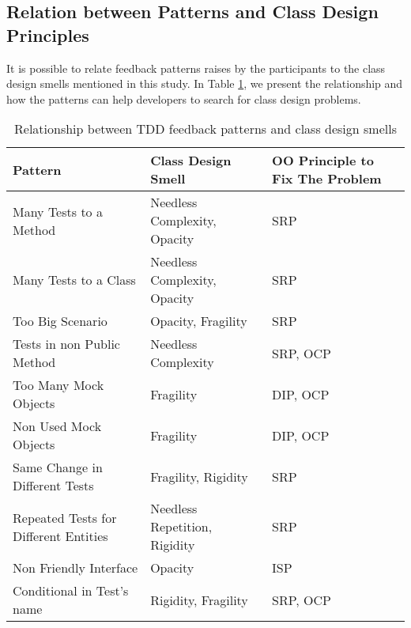 \documentclass[times]{elsarticle}
\begin{document}
\subsection{Relation between Patterns and Class Design Principles}

It is possible to relate feedback patterns raises by the participants to the class design
smells mentioned in this study.
In Table \ref{tab:relacao-padroes}, we present the relationship and how the patterns
can help developers to search for class design problems.

\begin{table}[h!]
	\centering
	\begin{tabular}{| p{4cm} | p{3.5cm} | p{3cm} | }
		\hline

		\textbf{Pattern} & \textbf{Class Design Smell} & \textbf{OO Principle to Fix The Problem}\\
		
		\hline

		Many Tests to a Method                   & Needless Complexity, Opacity   & SRP \\ \hline
		Many Tests to a Class                  & Needless Complexity, Opacity   & SRP \\ \hline
		Too Big Scenario                           & Opacity, Fragility                  & SRP \\ \hline
		Tests in non Public Method             & Needless Complexity              & SRP, OCP \\ \hline
		Too Many Mock Objects                       & Fragility                             & DIP, OCP \\ \hline
		Non Used Mock Objects                  & Fragility                             & DIP, OCP \\ \hline
		Same Change in Different Tests           & Fragility, Rigidity                    & SRP \\ \hline
		Repeated Tests for Different Entities     & Needless Repetition, Rigidity        & SRP  \\ \hline
		Non Friendly Interface                         & Opacity                               & ISP \\ \hline
		Conditional in Test's name                   & Rigidity, Fragility                    & SRP, OCP \\

		\hline
		
	\end{tabular}
	\caption{Relationship between TDD feedback patterns and class design smells}
	\label{tab:relacao-padroes}
\end{table}
\end{document}
